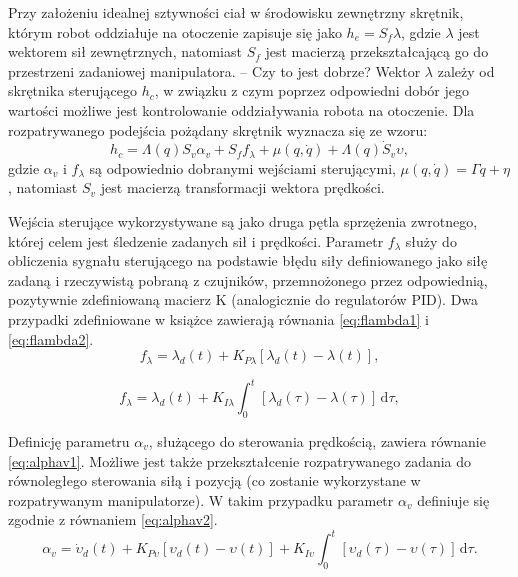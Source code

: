 \documentclass[printmode]{mgr}
\begin{document}
Przy założeniu idealnej sztywności ciał w środowisku zewnętrzny skrętnik, którym robot oddziałuje na otoczenie zapisuje się
jako $h_e = S_f \lambda$, gdzie $\lambda$ jest wektorem sił zewnętrznych, natomiast $S_f$ jest macierzą przekształcającą
go do przestrzeni zadaniowej manipulatora. -- Czy to jest dobrze?
Wektor $\lambda$ zależy od skrętnika sterującego $h_c$, w związku z czym poprzez odpowiedni dobór jego wartości
możliwe jest kontrolowanie oddziaływania robota na otoczenie. Dla rozpatrywanego podejścia pożądany skrętnik wyznacza się ze wzoru:
\begin{equation}
h_c = \Lambda(q)S_v\alpha_v + S_ff_{\lambda} + \mu(q, \dot{q}) + \Lambda(q)\dot{S}_v\upsilon,
\end{equation}
gdzie $\alpha_v$ i $f_{\lambda}$ są odpowiednio dobranymi wejściami sterującymi, $\mu(q, \dot{q}) = \Gamma \dot{q} + \eta$, natomiast $S_v$
jest macierzą transformacji wektora prędkości. 

Wejścia sterujące wykorzystywane są jako druga pętla sprzężenia zwrotnego, której celem jest śledzenie zadanych sił i prędkości. 
Parametr $f_{\lambda}$ służy do obliczenia sygnału sterującego na podstawie błędu siły definiowanego jako siłę zadaną i rzeczywistą
pobraną z czujników, przemnożonego przez odpowiednią, pozytywnie zdefiniowaną macierz K (analogicznie do regulatorów PID). 
Dwa przypadki zdefiniowane w książce \cite{handbook} zawierają równania \eqref{eq:flambda1} i \eqref{eq:flambda2}.
\begin{equation}
f_{\lambda} = \lambda_d(t) + K_{P\lambda}[\lambda_d(t) - \lambda(t)],
\label{eq:flambda1}
\end{equation}

\begin{equation}
f_{\lambda} = \lambda_d(t) + K_{I\lambda} \int_0^t \! [\lambda_d(\tau) - \lambda(\tau)] \, \mathrm{d} \tau,
\label{eq:flambda2}
\end{equation}

Definicję parametru $\alpha_v$, służącego do sterowania prędkością, zawiera równanie \eqref{eq:alphav1}. Możliwe jest także
przekształcenie rozpatrywanego zadania do równoległego sterowania siłą i pozycją (co zostanie wykorzystane w rozpatrywanym manipulatorze).
W takim przypadku parametr $\alpha_v$ definiuje się zgodnie z równaniem \eqref{eq:alphav2}.
\begin{equation}
\alpha_v = \dot{\upsilon}_d(t) + K_{P\upsilon}[\upsilon_d(t) - \upsilon(t)] + 
K_{I\upsilon} \int_0^t \! [\upsilon_d(\tau) - \upsilon(\tau)] \, \mathrm{d} \tau.
\label{eq:alphav1}
\end{equation}
\end{document}
